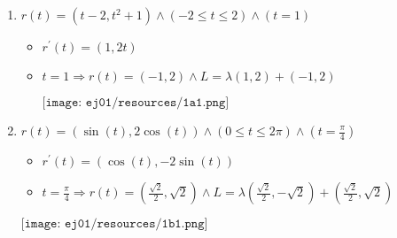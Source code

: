 \documentclass[../practica_04.tex]{subfiles}
\begin{document}
    \begin{enumerate}
        \item $r(t) = (t-2, t^2+1) \wedge (-2 \leq t \leq 2) \wedge (t = 1)$

            \begin{itemize}
                    \item $r^{\prime}(t) = (1,2t)$
                    \item $t = 1 \Rightarrow r(t) = (-1,2) \wedge L = \lambda(1,2) + (-1,2)$

                        $ \texttt{[image: ej01/resources/1a1.png]}  $

                \end{itemize}
                
                \item $r(t) = (\sin(t), 2\cos(t)) \wedge (0 \leq t \leq 2\pi) \wedge (t = \frac{\pi}{4})$
                
                \begin{itemize}
                    \item $r^{\prime}(t) = (\cos(t),-2\sin(t))$
                    \item $t=\frac{\pi}{4} \Rightarrow r(t) = (\frac{\sqrt{2}}{2}, \sqrt{2}) \wedge L = \lambda(\frac{\sqrt{2}}{2},-\sqrt{2}) + (\frac{\sqrt{2}}{2}, \sqrt{2})$
                \end{itemize}

                $ \texttt{[image: ej01/resources/1b1.png]}  $

    \end{enumerate}
\end{document}
